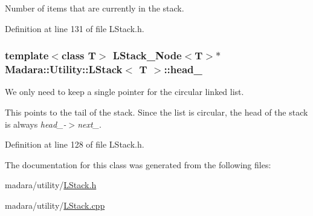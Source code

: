 Number of items that are currently in the stack. 



Definition at line 131 of file LStack.h.

\hypertarget{classMadara_1_1Utility_1_1LStack_aac3272ea2660d46d19513dba8118a3e8}{
\subsubsection[{head\_\-}]{\setlength{\rightskip}{0pt plus 5cm}template$<$class T$>$ {\bf LStack\_\-Node}$<$T$>$$\ast$ {\bf Madara::Utility::LStack}$<$ T $>$::{\bf head\_\-}}}
\label{d1/d68/classMadara_1_1Utility_1_1LStack_aac3272ea2660d46d19513dba8118a3e8}


We only need to keep a single pointer for the circular linked list. 

This points to the tail of the stack. Since the list is circular, the head of the stack is always {\itshape head\_\--\/$>$next\_\-\/}. 

Definition at line 128 of file LStack.h.



The documentation for this class was generated from the following files:\begin{DoxyCompactItemize}
\item 
madara/utility/\hyperlink{LStack_8h}{LStack.h}\item 
madara/utility/\hyperlink{LStack_8cpp}{LStack.cpp}\end{DoxyCompactItemize}
